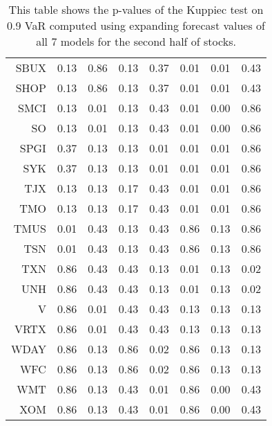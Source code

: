 \begin{table}[ht]
\begin{tabular}{rrrrrrrr}
  SBUX & 0.13 & 0.86 & 0.13 & 0.37 & 0.01 & 0.01 & 0.43 \\ 
  SHOP & 0.13 & 0.86 & 0.13 & 0.37 & 0.01 & 0.01 & 0.43 \\ 
  SMCI & 0.13 & 0.01 & 0.13 & 0.43 & 0.01 & 0.00 & 0.86 \\ 
  SO & 0.13 & 0.01 & 0.13 & 0.43 & 0.01 & 0.00 & 0.86 \\ 
  SPGI & 0.37 & 0.13 & 0.13 & 0.01 & 0.01 & 0.01 & 0.86 \\ 
  SYK & 0.37 & 0.13 & 0.13 & 0.01 & 0.01 & 0.01 & 0.86 \\ 
  TJX & 0.13 & 0.13 & 0.17 & 0.43 & 0.01 & 0.01 & 0.86 \\ 
  TMO & 0.13 & 0.13 & 0.17 & 0.43 & 0.01 & 0.01 & 0.86 \\ 
  TMUS & 0.01 & 0.43 & 0.13 & 0.43 & 0.86 & 0.13 & 0.86 \\ 
  TSN & 0.01 & 0.43 & 0.13 & 0.43 & 0.86 & 0.13 & 0.86 \\ 
  TXN & 0.86 & 0.43 & 0.43 & 0.13 & 0.01 & 0.13 & 0.02 \\ 
  UNH & 0.86 & 0.43 & 0.43 & 0.13 & 0.01 & 0.13 & 0.02 \\ 
  V & 0.86 & 0.01 & 0.43 & 0.43 & 0.13 & 0.13 & 0.13 \\ 
  VRTX & 0.86 & 0.01 & 0.43 & 0.43 & 0.13 & 0.13 & 0.13 \\ 
  WDAY & 0.86 & 0.13 & 0.86 & 0.02 & 0.86 & 0.13 & 0.13 \\ 
  WFC & 0.86 & 0.13 & 0.86 & 0.02 & 0.86 & 0.13 & 0.13 \\ 
  WMT & 0.86 & 0.13 & 0.43 & 0.01 & 0.86 & 0.00 & 0.43 \\ 
  XOM & 0.86 & 0.13 & 0.43 & 0.01 & 0.86 & 0.00 & 0.43 \\ 
   \hline
\end{tabular}
\caption[Kupiec test p-values, alpha =0.9 (2)]{This table shows the p-values of the Kuppiec test on 0.9 VaR computed using expanding forecast values of all 7 models for the second half of stocks.} 
\label{Table:Kupiec_test_expanding_0.9_2}
\end{table}
